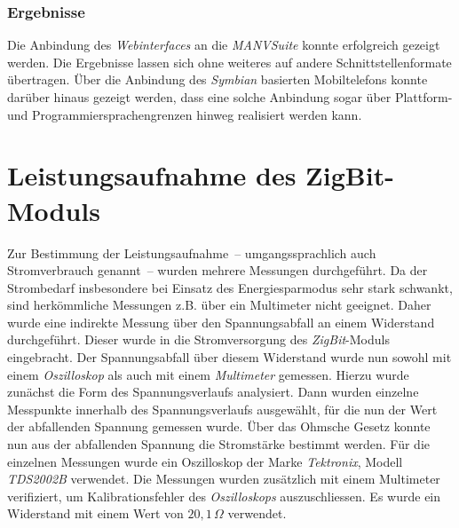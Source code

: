 \subsubsection{Ergebnisse}
Die Anbindung des \emph{Webinterfaces} an die \emph{MANVSuite} konnte erfolgreich gezeigt werden. Die
Ergebnisse lassen sich ohne weiteres auf andere Schnittstellenformate übertragen. Über die Anbindung
des \emph{Symbian} basierten Mobiltelefons konnte darüber hinaus gezeigt werden, dass eine solche
Anbindung sogar über Plattform- und Programmiersprachengrenzen hinweg realisiert werden kann. 

\section{Leistungsaufnahme des ZigBit-Moduls}
Zur Bestimmung der Leistungsaufnahme~-- umgangssprachlich auch Strom\-ver\-brauch genannt~-- wurden mehrere Messungen 
durchgeführt.
Da der Strombedarf insbesondere bei Einsatz des Energiesparmodus sehr stark schwankt, sind herkömmliche Messungen
z.B. über ein Multimeter nicht geeignet. Daher wurde eine indirekte Messung über den Spannungsabfall an einem 
Widerstand durchgeführt. Dieser wurde in die Stromversorgung des \emph{ZigBit}-Moduls eingebracht. Der 
Spannungsabfall über diesem Widerstand wurde nun sowohl mit einem \emph{Oszilloskop} als auch mit einem \emph{Multimeter}
gemessen. Hierzu wurde zunächst die Form des Spannungsverlaufs analysiert. Dann wurden einzelne Messpunkte innerhalb 
des Spannungsverlaufs ausgewählt, für die nun der Wert der abfallenden Spannung gemessen wurde. Über das Ohmsche Gesetz 
konnte nun aus der abfallenden
Spannung die Stromstärke bestimmt werden. Für die einzelnen Messungen wurde ein Oszilloskop der Marke \emph{Tektronix}, 
Modell \emph{TDS2002B} verwendet. Die Messungen wurden zusätzlich mit einem Multimeter verifiziert,
um Kalibrationsfehler des \emph{Oszilloskops} auszuschliessen. Es wurde ein Widerstand mit einem Wert von $20,1\,\Omega$
verwendet.

